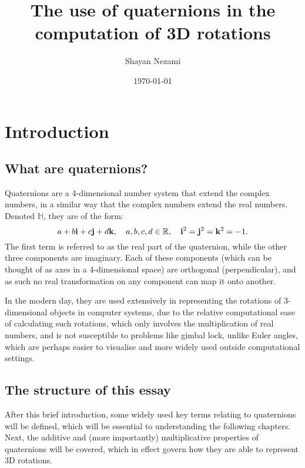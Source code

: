 \documentclass[10pt]{article}
\title{The use of quaternions in the computation of 3D rotations}
\author{Shayan Nezami}
\date{\today}
\begin{document}
\maketitle	
\pagebreak

\tableofcontents
\pagebreak

\section{Introduction}

\subsection{What are quaternions?}

Quaternions are a 4-dimensional number system that extend the complex numbers, in a similar way that the complex numbers extend the real numbers. Denoted $\mathbb{H}$, they are of the form:
\begin{equation}
    a + b\vb{i} + c\vb{j} + d\vb{k}, \quad a, b, c, d \in \mathbb{R}, \quad \vb{i}^2=\vb{j}^2=\vb{k}^2=-1.
\end{equation}
The first term is referred to as the real part of the quaternion, while the other three components are imaginary. Each of these components (which can be thought of as axes in a 4-dimensional space) are orthogonal (perpendicular), and as such no real transformation on any component can map it onto another.

In the modern day, they are used extensively in representing the rotations of 3-dimensional objects in computer systems, due to the relative computational ease of calculating such rotations, which only involves the multiplication of real numbers, and is not susceptible to problems like gimbal lock, unlike Euler angles, which are perhaps easier to visualise and more widely used outside computational settings. \cite{QuaternionWiki}

\subsection{The structure of this essay}

After this brief introduction, some widely used key terms relating to quaternions will be defined, which will be essential to understanding the following chapters. Next, the additive and (more importantly) multiplicative properties of quaternions will be covered, which in effect govern how they are able to represent 3D rotations.
\end{document}
